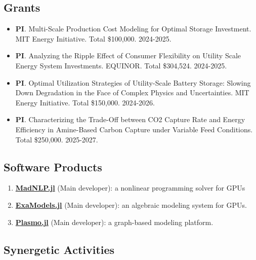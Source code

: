 \documentclass[letterpaper, 11pt]{article}
\begin{document}
\subsection*{Grants}
\begin{itemize}[itemsep=1pt, parsep=0pt,leftmargin=*]
\item[] \textbf{PI}. Multi-Scale Production Cost Modeling for Optimal Storage Investment. MIT Energy Initiative. Total \$100,000. 2024-2025.
\item[] \textbf{PI}. Analyzing the Ripple Effect of Consumer Flexibility on Utility Scale Energy System Investments. EQUINOR. Total \$304,524. 2024-2025.
\item[] \textbf{PI}. Optimal Utilization Strategies of Utility-Scale Battery Storage: Slowing Down Degradation in the Face of Complex Physics and Uncertainties. MIT Energy Initiative. Total \$150,000. 2024-2026.
\item[] \textbf{PI}. Characterizing the Trade-Off between CO2 Capture Rate and Energy Efficiency in Amine-Based Carbon Capture under Variable Feed Conditions. Total \$250,000. 2025-2027.
\end{itemize}

\subsection*{Software Products}
\begin{enumerate}[itemsep=1pt, parsep=0pt]
\renewcommand*{\labelenumi}{[S\theenumi]}
\item {\bf \href{https://github.com/MadNLP/MadNLP.jl}{MadNLP.jl}} (Main developer): a nonlinear programming solver for GPUs
\item {\bf \href{https://github.com/exanauts/ExaModels.jl}{ExaModels.jl}} (Main developer): an algebraic modeling system for GPUs.
\item {\bf \href{https://github.com/plasmo-dev/Plasmo.jl}{Plasmo.jl}} (Main developer): a graph-based modeling platform.
\end{enumerate}

\subsection*{Synergetic Activities}
\end{document}
